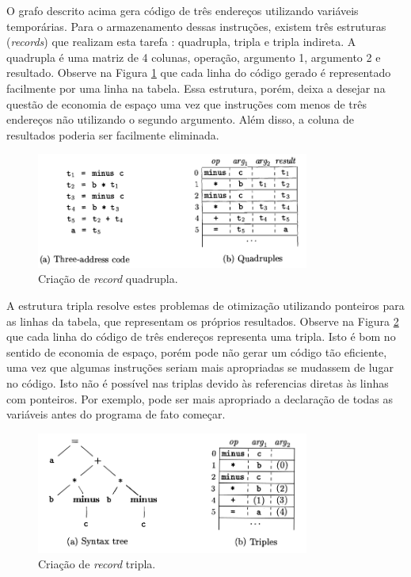 \documentclass[12pt]{article}
\begin{document}
\indent O grafo descrito acima gera código de três endereços utilizando variáveis temporárias. Para o armazenamento dessas instruções, existem três estruturas (\textit{records}) que realizam esta tarefa \cite{book}: quadrupla, tripla e tripla indireta. A quadrupla é uma matriz de 4 colunas, operação, argumento 1, argumento 2 e resultado. Observe na Figura \ref{fig:quadruple} que cada linha do código gerado é representado facilmente por uma linha na tabela. Essa estrutura, porém, deixa a desejar na questão de economia de espaço uma vez que instruções com menos de três endereços não utilizando o segundo argumento. Além disso, a coluna de resultados poderia ser facilmente eliminada.

\begin{figure}[!ht]
  \centering
  \includegraphics[width=0.8\textwidth]{quadruple.png}
  \caption{Criação de \textit{record} quadrupla.} \label{fig:quadruple}
\end{figure}

\indent A estrutura tripla resolve estes problemas de otimização utilizando ponteiros para as linhas da tabela, que representam os próprios resultados. Observe na Figura \ref{fig:triple} que cada linha do código de três endereços representa uma tripla. Isto é bom no sentido de economia de espaço, porém pode não gerar um código tão eficiente, uma vez que algumas instruções seriam mais apropriadas se mudassem de lugar no código. Isto não é possível nas triplas devido às referencias diretas às linhas com ponteiros. Por exemplo, pode ser mais apropriado a declaração de todas as variáveis antes do programa de fato começar. 

\begin{figure}[!ht]
  \centering
  \includegraphics[width=0.8\textwidth]{triple.png}
  \caption{Criação de \textit{record} tripla.} \label{fig:triple}
\end{figure}
\end{document}
